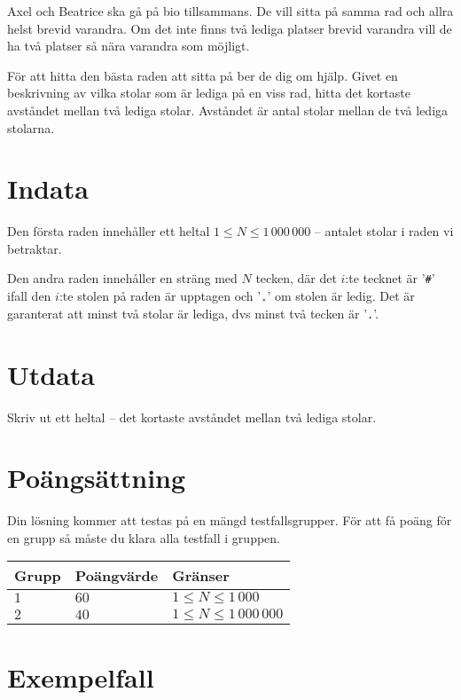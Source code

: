 
Axel och Beatrice ska gå på bio tillsammans.
De vill sitta på samma rad och allra helst brevid varandra.
Om det inte finns två lediga platser brevid varandra vill de ha två platser så nära varandra som möjligt.

För att hitta den bästa raden att sitta på ber de dig om hjälp.
Givet en beskrivning av vilka stolar som är lediga på en viss rad,
hitta det kortaste avståndet mellan två lediga stolar. Avståndet är antal stolar mellan de två lediga stolarna.


\section*{Indata}
Den första raden innehåller ett heltal $1 \le N \le 1\,000\,000$ -- antalet stolar i raden vi betraktar.

Den andra raden innehåller en sträng med $N$ tecken,
där det $i$:te tecknet är '\texttt{\#}' ifall den $i$:te stolen på raden är upptagen och '\texttt{.}' om stolen är ledig.
Det är garanterat att minst två stolar är lediga, dvs minst två tecken är '\texttt{.}'.

\section*{Utdata}
Skriv ut ett heltal -- det kortaste avståndet mellan två lediga stolar.

\section*{Poängsättning}
Din lösning kommer att testas på en mängd testfallsgrupper.
För att få poäng för en grupp så måste du klara alla testfall i gruppen.

\noindent
\begin{tabular}{| l | l | l |}
  \hline
  Grupp & Poängvärde & Gränser \\ \hline
  $1$    & $60$        &  $1 \le N \le 1\,000$ \\ \hline 
  $2$    & $40$        &  $1 \le N \le 1\,000\,000$ \\ \hline
\end{tabular}

\section*{Exempelfall}
